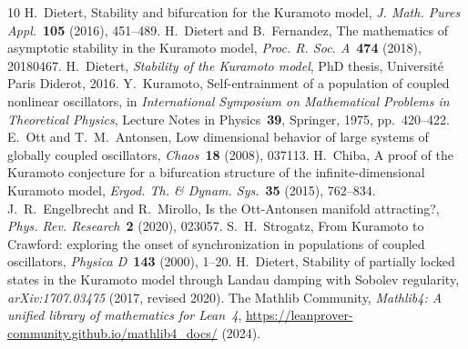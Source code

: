 \documentclass[11pt,a4paper]{article}
\theoremstyle{definition}
\begin{document}
\begin{thebibliography}{10}
 H.~Dietert, Stability and bifurcation for the Kuramoto model, \emph{J. Math. Pures Appl.}~\textbf{105} (2016), 451--489.
 H.~Dietert and B.~Fernandez, The mathematics of asymptotic stability in the Kuramoto model, \emph{Proc. R. Soc. A}~\textbf{474} (2018), 20180467.
 H.~Dietert, \emph{Stability of the Kuramoto model}, PhD thesis, Universit\'e Paris Diderot, 2016.
 Y.~Kuramoto, Self-entrainment of a population of coupled nonlinear oscillators, in \emph{International Symposium on Mathematical Problems in Theoretical Physics}, Lecture Notes in Physics~\textbf{39}, Springer, 1975, pp.~420--422.
 E.~Ott and T.~M.~Antonsen, Low dimensional behavior of large systems of globally coupled oscillators, \emph{Chaos}~\textbf{18} (2008), 037113.
 H.~Chiba, A proof of the Kuramoto conjecture for a bifurcation structure of the infinite-dimensional Kuramoto model, \emph{Ergod. Th. \& Dynam. Sys.}~\textbf{35} (2015), 762--834.
 J.~R.~Engelbrecht and R.~Mirollo, Is the Ott-Antonsen manifold attracting?, \emph{Phys. Rev. Research}~\textbf{2} (2020), 023057.
 S.~H.~Strogatz, From Kuramoto to Crawford: exploring the onset of synchronization in populations of coupled oscillators, \emph{Physica D}~\textbf{143} (2000), 1--20.
 H.~Dietert, Stability of partially locked states in the Kuramoto model through Landau damping with Sobolev regularity, \emph{arXiv:1707.03475} (2017, revised 2020).
 The Mathlib Community, \emph{Mathlib4: A unified library of mathematics for Lean~4}, \url{https://leanprover-community.github.io/mathlib4_docs/} (2024).
\end{thebibliography}
\end{document}
